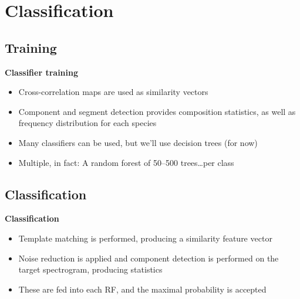 \documentclass[t, xcolor={dvipsnames}]{beamer}
\begin{document}

\section{Classification}
\subsection{Training}
\begin{frame}[fragile]
  \vspace{0.5cm}
  {\bfseries\Large Classifier training}\\
  \vspace{0.5cm}
  \begin{addmargin}{0.5cm}
    \begin{itemize}
      \item Cross-correlation maps are used as similarity vectors
      \item Component and segment detection provides composition statistics, as well as frequency distribution for each species
      \item Many classifiers can be used, but we'll use decision trees (for now)
      \item Multiple, in fact: A random forest of 50--500 trees\ldots per class
    \end{itemize}
  \end{addmargin}
\end{frame}

\subsection{Classification}
\begin{frame}[fragile]
  \vspace{0.5cm}
  {\bfseries\Large Classification}
  \vspace{0.5cm}
  \begin{addmargin}{0.5cm}
    \begin{itemize}
      \item Template matching is performed, producing a similarity feature vector
      \item Noise reduction is applied and component detection is performed on the target spectrogram, producing statistics
      \item These are fed into each RF, and the maximal probability is accepted
    \end{itemize}
  \end{addmargin}
\end{frame}
\end{document}
